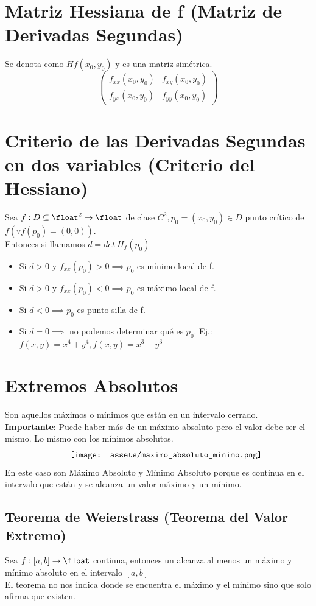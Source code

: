 \documentclass[10pt,a4paper]{article}
\begin{document}
\section*{Matriz Hessiana de f (Matriz de Derivadas Segundas)}
Se denota como $Hf(x_{0}, y_{0})$ y es una matriz simétrica.
\[
\begin{pmatrix}
f_{xx}(x_{0}, y_{0}) & f_{xy}(x_{0}, y_{0}) \\
f_{yx}(x_{0}, y_{0}) & f_{yy}(x_{0}, y_{0})
\end{pmatrix}
\]
\section*{Criterio de las Derivadas Segundas en dos variables (Criterio del Hessiano)}
Sea $f:D \subseteq \float^{2} \rightarrow \float$ de clase $C^{2}, p_{0} = (x_{0}, y_{0}) \in D$ punto crítico de $f(\triangledown f(p_{0}) = (0,0))$. \\
Entonces si llamamos $d = det \ H_{f}(p_{0})$
\begin{itemize}
    \item Si $d>0$ y $f_{xx}(p_{0}) > 0 \implies p_{0}$ es mínimo local de f.
    \item Si $d>0$ y $f_{xx}(p_{0}) < 0 \implies p_{0}$ es máximo local de f.
    \item Si $d<0 \implies p_{0}$ es punto silla de f.
    \item Si $d=0 \implies$ no podemos determinar qué es $p_{0}$. Ej.: $f(x,y) = x^{4} + y^{4}, f(x,y) = x^{3}-y^{3}$
\end{itemize}
\section*{Extremos Absolutos}
Son aquellos máximos o mínimos que están en un intervalo cerrado. \\
\textbf{Importante}: Puede haber más de un máximo absoluto pero el valor debe ser el mismo. Lo mismo con los mínimos absolutos. \\
\[\begin{minipage}[b]{0.6\textwidth}
    \texttt{[image: assets/maximo\_absoluto\_minimo.png]}
\end{minipage}\]
En este caso son Máximo Absoluto y Mínimo Absoluto porque es continua en el intervalo que están y se alcanza un valor máximo y un mínimo. 
\subsection*{Teorema de Weierstrass (Teorema del Valor Extremo)}
Sea $f:[a, b] \rightarrow \float$ continua, entonces un alcanza al menos un máximo y mínimo absoluto en el intervalo $[a, b]$ \\
El teorema no nos indica donde se encuentra el máximo y el minimo sino que solo afirma que existen. 
\end{document}
